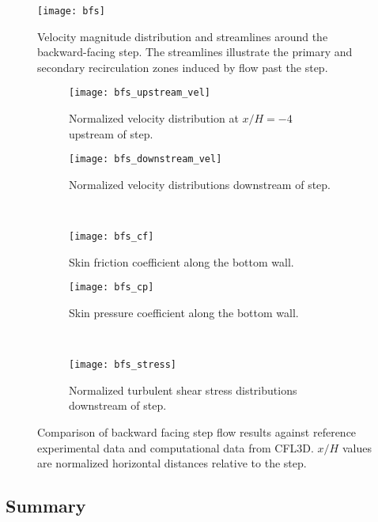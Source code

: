 \begin{figure}[htb!]
  \centering
  \texttt{[image: bfs]}
  \caption{Velocity magnitude distribution and streamlines around the backward-facing step. The
  streamlines illustrate the primary and secondary recirculation zones induced by flow past the
  step.}
  \label{fig:bfs}
\end{figure}

\begin{figure}[htb]
  \centering
  \hfill
  \begin{subfigure}[b]{0.38\columnwidth}
    \centering
    \texttt{[image: bfs\_upstream\_vel]}
    \caption{Normalized velocity distribution at $x/H=-4$ upstream of step.}
    \label{fig:bfs-upstream}
  \end{subfigure}
  \hfill
  \begin{subfigure}[b]{0.38\columnwidth}
    \centering
    \texttt{[image: bfs\_downstream\_vel]}
    \caption{Normalized velocity distributions downstream of step.}
    \label{fig:bfs-downstream}
  \end{subfigure} \hfill \\
  \centering
  \hfill
  \begin{subfigure}[b]{0.38\columnwidth}
    \centering
    \texttt{[image: bfs\_cf]}
    \caption{Skin friction coefficient along the bottom wall.}
    \label{fig:bfs-cf}
  \end{subfigure}
  \hfill
  \begin{subfigure}[b]{0.38\columnwidth}
    \centering
    \texttt{[image: bfs\_cp]}
    \caption{Skin pressure coefficient along the bottom wall.}
    \label{fig:bfs-cp}
  \end{subfigure} \hfill \\
  \centering
  \begin{subfigure}[b]{0.38\columnwidth}
    \centering
    \texttt{[image: bfs\_stress]}
    \caption{Normalized turbulent shear stress distributions downstream
    of step.}
    \label{fig:bfs-stress}
  \end{subfigure}
  \caption{Comparison of backward facing step flow results against reference
  experimental data and computational data from CFL3D. $x/H$ values are normalized horizontal
  distances relative to the step.}
  \label{fig:bfs-plots}
\end{figure}

\subsection{Summary}

